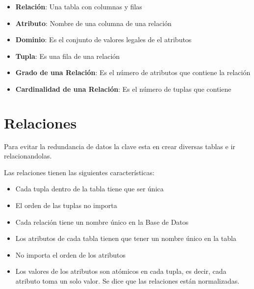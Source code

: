 \documentclass[12pt, fleqn]{report}                             %
\begin{document}
            \begin{itemize}
                \item \textbf{Relación}: Una tabla con columnas y filas
                \item \textbf{Atributo}: Nombre de una columna de una relación
                \item \textbf{Dominio}: Es el conjunto de valores legales de el atributos
                \item \textbf{Tupla}: Es una fila de una relación
                \item \textbf{Grado de una Relación}: Es el número de atributos que contiene la relación
                \item \textbf{Cardinalidad de una Relación}: Es el número de tuplas que contiene
            \end{itemize}




        \clearpage
        \section{Relaciones}

            Para evitar la redundancia de datos la clave esta en crear diversas tablas
            e ir relacionandolas.

            Las relaciones tienen las siguientes características:

            \begin{itemize}
                \item Cada tupla dentro de la tabla tiene que ser única
                \item El orden de las tuplas no importa
                \item Cada relación tiene un nombre único en la Base de Datos
                \item Los atributos de cada tabla tienen que tener un nombre único en la tabla
                \item No importa el orden de los atributos
                \item Los valores de los atributos son atómicos en cada tupla, es decir,
                    cada atributo toma un solo valor. Se dice que las relaciones están normalizadas.
            \end{itemize}
\end{document}
